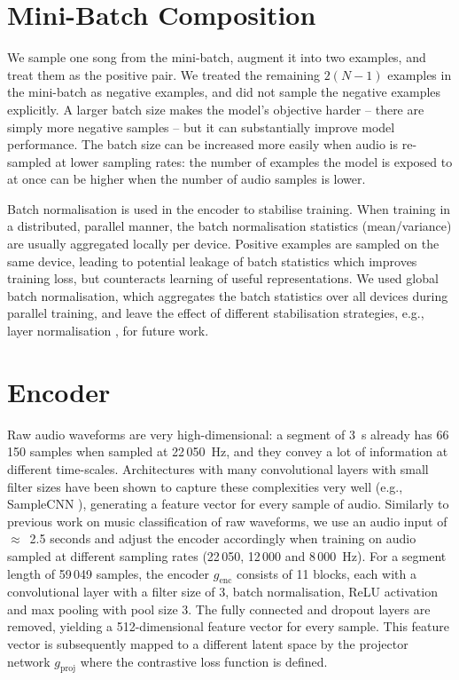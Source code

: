 \documentclass{report}
\begin{document}
\section{Mini-Batch Composition} %
We sample one song from the mini-batch, augment it into two examples, and treat them as the positive pair. We treated the remaining $2(N-1)$ examples in the mini-batch as negative examples, and did not sample the negative examples explicitly. A larger batch size makes the model's objective harder -- there are simply more negative samples -- but it can substantially improve model performance\cite{chen_simple_2020}. The batch size can be increased more easily when audio is re-sampled at lower sampling rates: the number of examples the model is exposed to at once can be higher when the number of audio samples is lower.

Batch normalisation\cite{batch_normalisation} is used in the encoder to stabilise training. When training in a distributed, parallel manner, the batch normalisation statistics (mean/variance) are usually aggregated locally per device. Positive examples are sampled on the same device, leading to potential leakage of batch statistics which improves training loss, but counteracts learning of useful representations. We used global batch normalisation, which aggregates the batch statistics over all devices during parallel training, and leave the effect of different stabilisation strategies, e.g., layer normalisation \cite{henaff2019data}, for future work.


\section{Encoder}
Raw audio waveforms are very high-dimensional: a segment of 3~s already has 66\,150 samples when sampled at 22\,050~Hz, and they convey a lot of information at different time-scales. Architectures with many convolutional layers with small filter sizes have been shown to capture these complexities very well (e.g., SampleCNN \cite{lee2018samplecnn}), generating a feature vector for every sample of audio. Similarly to previous work on music classification of raw waveforms, we use an audio input of $\approx$~2.5 seconds\cite{dieleman2014end,lee2018samplecnn,pons_end--end_2017} and adjust the encoder accordingly when training on audio sampled at different sampling rates (22\,050, 12\,000 and 8\,000~Hz). For a segment length of 59\,049 samples, the encoder $g_{\mathrm{enc}}$ consists of 11 blocks, each with a convolutional layer with a filter size of 3, batch normalisation, ReLU activation and max pooling with pool size 3. The fully connected and dropout layers are removed, yielding a 512-dimensional feature vector for every sample. This feature vector is subsequently mapped to a different latent space by the projector network $g_{\mathrm{proj}}$ where the contrastive loss function is defined.
\end{document}
